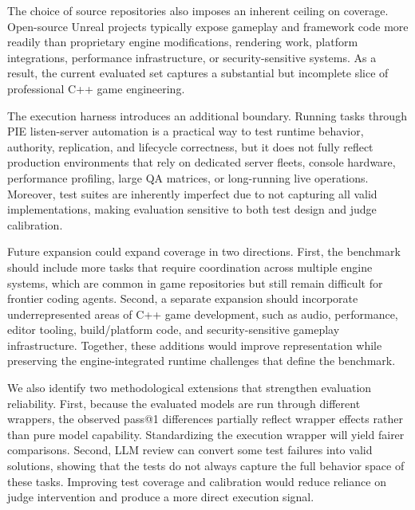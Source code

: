 \documentclass[11pt]{article}
\begin{document}
The choice of source repositories also imposes an inherent ceiling on coverage. Open-source Unreal projects typically expose gameplay and framework code more readily than proprietary engine modifications, rendering work, platform integrations, performance infrastructure, or security-sensitive systems. As a result, the current evaluated set captures a substantial but incomplete slice of professional C++ game engineering.

The execution harness introduces an additional boundary. Running tasks through PIE listen-server automation is a practical way to test runtime behavior, authority, replication, and lifecycle correctness, but it does not fully reflect production environments that rely on dedicated server fleets, console hardware, performance profiling, large QA matrices, or long-running live operations. Moreover, test suites are inherently imperfect due to not capturing all valid implementations, making evaluation sensitive to both test design and judge calibration.

Future expansion could expand coverage in two directions. First, the benchmark should include more tasks that require coordination across multiple engine systems, which are common in game repositories but still remain difficult for frontier coding agents. Second, a separate expansion should incorporate underrepresented areas of C++ game development, such as audio, performance, editor tooling, build/platform code, and security-sensitive gameplay infrastructure. Together, these additions would improve representation while preserving the engine-integrated runtime challenges that define the benchmark.

We also identify two methodological extensions that strengthen evaluation reliability. First, because the evaluated models are run through different wrappers, the observed pass@1 differences partially reflect wrapper effects rather than pure model capability. Standardizing the execution wrapper will yield fairer comparisons. Second, LLM review can convert some test failures into valid solutions, showing that the tests do not always capture the full behavior space of these tasks. Improving test coverage and calibration would reduce reliance on judge intervention and produce a more direct execution signal.

\FloatBarrier
\end{document}
